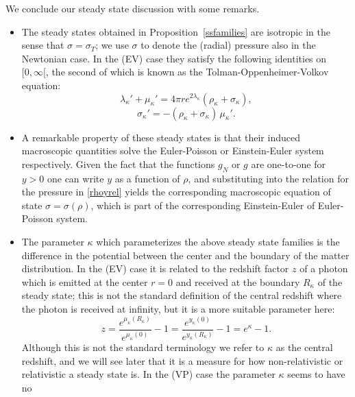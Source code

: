\documentclass[11pt]{article}
\begin{document}
We conclude our steady state discussion with some remarks.
%
\begin{remark}
  \begin{itemize}
  \item[(a)]
    The steady states obtained in Proposition~\ref{ssfamilies} are
    isotropic in the sense
    that $\sigma = \sigma_T$; we use $\sigma$ to denote the (radial)
    pressure also in the Newtonian case.
    In the (EV) case they satisfy the following identities
    on  $[0,\infty[$, the second of which is
    known as the Tolman-Oppenheimer-Volkov equation:
    \begin{equation} \label{laplusmu}
      \lambda_\kappa' + \mu_\kappa'
      = 4 \pi r e^{2\lambda_\kappa} \left(\rho_\kappa +\sigma_\kappa\right),
    \end{equation}
    \begin{equation} \label{tov}
      \sigma_\kappa' = - \left(\rho_\kappa +\sigma_\kappa\right) \,\mu_\kappa'.
    \end{equation}
  \item[(b)]
    A remarkable property of these steady states is that their induced
    macroscopic quantities solve the Euler-Poisson or Einstein-Euler
    system respectively. Given the fact that the functions $g_N$ or $g$
    are one-to-one for $y>0$ one can write $y$ as a function of $\rho$,
    and substituting into the relation for the pressure in \eqref{rhoyrel}
    yields the corresponding macroscopic equation
    of state $\sigma = \sigma(\rho)$, which is part of the corresponding
    Einstein-Euler of Euler-Poisson system.
  \item[(c)]
    The parameter $\kappa$ which parameterizes the above steady state families
    is the difference in the potential between the center and the boundary
    of the matter distribution. In the (EV) case it is related
    to the redshift factor $z$
    of a photon which is emitted at the center $r=0$ and received at the
    boundary $R_\kappa$ of the steady state; this is not the standard definition
    of the central redshift where the photon is received at infinity,
    but it is a more suitable parameter here:
    \[ 
    z = \frac{e^{\mu_\kappa(R_\kappa)}}{e^{\mu_\kappa(0)}} - 1
    = \frac{e^{y_\kappa(0)}}{e^{y_\kappa(R_\kappa)}} - 1 = e^\kappa -1.
    \]
    Although this is not the standard terminology
    we refer to $\kappa$ as the central redshift, and we will see later
    that it is a measure for how non-relativistic or relativistic a steady
    state is. In the (VP) case the parameter $\kappa$ seems to have no

\end{itemize}
\end{remark}
\end{document}
